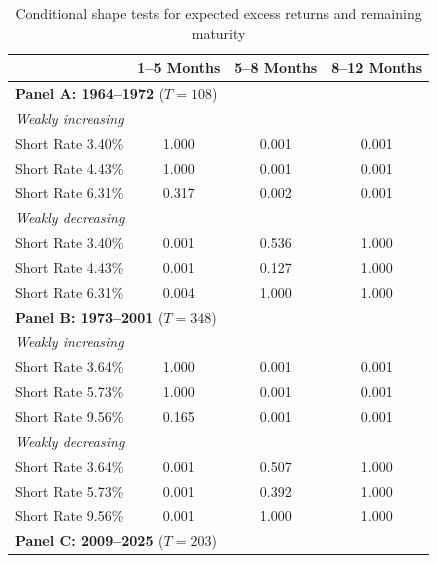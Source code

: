 \begin{table}[!htbp]
\centering
\caption{Conditional shape tests for expected excess returns and remaining maturity}
\label{tab:e4_shape_tests}
\begin{tabular}{lccc}
\toprule
 & 1--5 Months & 5--8 Months & 8--12 Months \\
\midrule
\multicolumn{4}{l}{\textbf{Panel A: 1964--1972} ($T = 108$)} \\
\multicolumn{4}{l}{\quad\textit{Weakly increasing}} \\
\qquad Short Rate 3.40\% & 1.000 & \llap{$<$\,}0.001\rlap{$^{***}$} & \llap{$<$\,}0.001\rlap{$^{***}$} \\
\qquad Short Rate 4.43\% & 1.000 & \llap{$<$\,}0.001\rlap{$^{***}$} & \llap{$<$\,}0.001\rlap{$^{***}$} \\
\qquad Short Rate 6.31\% & 0.317 & 0.002\rlap{$^{***}$} & 0.001\rlap{$^{***}$} \\
\multicolumn{4}{l}{\quad\textit{Weakly decreasing}} \\
\qquad Short Rate 3.40\% & \llap{$<$\,}0.001\rlap{$^{***}$} & 0.536 & 1.000 \\
\qquad Short Rate 4.43\% & \llap{$<$\,}0.001\rlap{$^{***}$} & 0.127 & 1.000 \\
\qquad Short Rate 6.31\% & 0.004\rlap{$^{***}$} & 1.000 & 1.000 \\
\midrule
\multicolumn{4}{l}{\textbf{Panel B: 1973--2001} ($T = 348$)} \\
\multicolumn{4}{l}{\quad\textit{Weakly increasing}} \\
\qquad Short Rate 3.64\% & 1.000 & \llap{$<$\,}0.001\rlap{$^{***}$} & \llap{$<$\,}0.001\rlap{$^{***}$} \\
\qquad Short Rate 5.73\% & 1.000 & \llap{$<$\,}0.001\rlap{$^{***}$} & \llap{$<$\,}0.001\rlap{$^{***}$} \\
\qquad Short Rate 9.56\% & 0.165 & \llap{$<$\,}0.001\rlap{$^{***}$} & \llap{$<$\,}0.001\rlap{$^{***}$} \\
\multicolumn{4}{l}{\quad\textit{Weakly decreasing}} \\
\qquad Short Rate 3.64\% & \llap{$<$\,}0.001\rlap{$^{***}$} & 0.507 & 1.000 \\
\qquad Short Rate 5.73\% & \llap{$<$\,}0.001\rlap{$^{***}$} & 0.392 & 1.000 \\
\qquad Short Rate 9.56\% & \llap{$<$\,}0.001\rlap{$^{***}$} & 1.000 & 1.000 \\
\midrule
\multicolumn{4}{l}{\textbf{Panel C: 2009--2025} ($T = 203$)} \\

\end{tabular}
\end{table}
